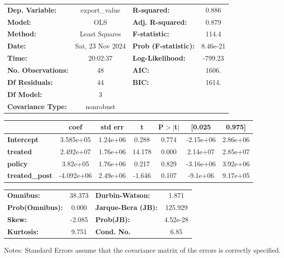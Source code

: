 \begin{center}
\begin{tabular}{lclc}
\toprule
\textbf{Dep. Variable:}    &  export\_value   & \textbf{  R-squared:         } &     0.886   \\
\textbf{Model:}            &       OLS        & \textbf{  Adj. R-squared:    } &     0.879   \\
\textbf{Method:}           &  Least Squares   & \textbf{  F-statistic:       } &     114.4   \\
\textbf{Date:}             & Sat, 23 Nov 2024 & \textbf{  Prob (F-statistic):} &  8.46e-21   \\
\textbf{Time:}             &     20:02:37     & \textbf{  Log-Likelihood:    } &   -799.23   \\
\textbf{No. Observations:} &          48      & \textbf{  AIC:               } &     1606.   \\
\textbf{Df Residuals:}     &          44      & \textbf{  BIC:               } &     1614.   \\
\textbf{Df Model:}         &           3      & \textbf{                     } &             \\
\textbf{Covariance Type:}  &    nonrobust     & \textbf{                     } &             \\
\bottomrule
\end{tabular}
\begin{tabular}{lcccccc}
                       & \textbf{coef} & \textbf{std err} & \textbf{t} & \textbf{P$> |$t$|$} & \textbf{[0.025} & \textbf{0.975]}  \\
\midrule
\textbf{Intercept}     &    3.585e+05  &     1.24e+06     &     0.288  &         0.774        &    -2.15e+06    &     2.86e+06     \\
\textbf{treated}       &    2.492e+07  &     1.76e+06     &    14.178  &         0.000        &     2.14e+07    &     2.85e+07     \\
\textbf{policy}        &     3.82e+05  &     1.76e+06     &     0.217  &         0.829        &    -3.16e+06    &     3.92e+06     \\
\textbf{treated\_post} &   -4.092e+06  &     2.49e+06     &    -1.646  &         0.107        &     -9.1e+06    &     9.17e+05     \\
\bottomrule
\end{tabular}
\begin{tabular}{lclc}
\textbf{Omnibus:}       & 38.373 & \textbf{  Durbin-Watson:     } &    1.871  \\
\textbf{Prob(Omnibus):} &  0.000 & \textbf{  Jarque-Bera (JB):  } &  125.929  \\
\textbf{Skew:}          & -2.085 & \textbf{  Prob(JB):          } & 4.52e-28  \\
\textbf{Kurtosis:}      &  9.751 & \textbf{  Cond. No.          } &     6.85  \\
\bottomrule
\end{tabular}
\end{center}

Notes: \newline
 [1] Standard Errors assume that the covariance matrix of the errors is correctly specified.